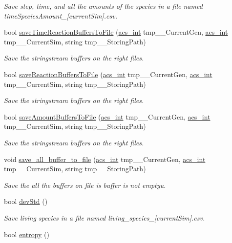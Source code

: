 \begin{DoxyCompactItemize}
\begin{DoxyCompactList}\small\item\em Save step, time, and all the amounts of the species in a file named time\-Species\-Amount\-\_\-\mbox{[}current\-Sim\mbox{]}.csv. \end{DoxyCompactList}\item 
bool \hyperlink{a00011_af36d51ba1965d3f23c879c0d0fb69026}{save\-Time\-Reaction\-Buffers\-To\-File} (\hyperlink{a00024_a8d277355641a098190360234e2ebde35}{acs\-\_\-int} tmp\-\_\-\-\_\-\-Current\-Gen, \hyperlink{a00024_a8d277355641a098190360234e2ebde35}{acs\-\_\-int} tmp\-\_\-\-\_\-\-Current\-Sim, string tmp\-\_\-\-\_\-\-Storing\-Path)
\begin{DoxyCompactList}\small\item\em Save the stringstream buffers on the right files. \end{DoxyCompactList}\item 
bool \hyperlink{a00011_ad88fbfd83b7713baf3b528d9a3675540}{save\-Reaction\-Buffers\-To\-File} (\hyperlink{a00024_a8d277355641a098190360234e2ebde35}{acs\-\_\-int} tmp\-\_\-\-\_\-\-Current\-Gen, \hyperlink{a00024_a8d277355641a098190360234e2ebde35}{acs\-\_\-int} tmp\-\_\-\-\_\-\-Current\-Sim, string tmp\-\_\-\-\_\-\-Storing\-Path)
\begin{DoxyCompactList}\small\item\em Save the stringstream buffers on the right files. \end{DoxyCompactList}\item 
bool \hyperlink{a00011_a3a7c8819ab4e81a3e2f18d193ba9176f}{save\-Amount\-Buffers\-To\-File} (\hyperlink{a00024_a8d277355641a098190360234e2ebde35}{acs\-\_\-int} tmp\-\_\-\-\_\-\-Current\-Gen, \hyperlink{a00024_a8d277355641a098190360234e2ebde35}{acs\-\_\-int} tmp\-\_\-\-\_\-\-Current\-Sim, string tmp\-\_\-\-\_\-\-Storing\-Path)
\begin{DoxyCompactList}\small\item\em Save the stringstream buffers on the right files. \end{DoxyCompactList}\item 
void \hyperlink{a00011_ac8b2bc669994dd3850769f4835dd40a2}{save\-\_\-all\-\_\-buffer\-\_\-to\-\_\-file} (\hyperlink{a00024_a8d277355641a098190360234e2ebde35}{acs\-\_\-int} tmp\-\_\-\-\_\-\-Current\-Gen, \hyperlink{a00024_a8d277355641a098190360234e2ebde35}{acs\-\_\-int} tmp\-\_\-\-\_\-\-Current\-Sim, string tmp\-\_\-\-\_\-\-Storing\-Path)
\begin{DoxyCompactList}\small\item\em Save the all the buffers on file is buffer is not emptyu. \end{DoxyCompactList}\item 
bool \hyperlink{a00011_ae7fd21d14f81c4854b3a6163b0278857}{dev\-Std} ()
\begin{DoxyCompactList}\small\item\em Save living species in a file named living\-\_\-species\-\_\-\mbox{[}current\-Sim\mbox{]}.csv. \end{DoxyCompactList}\item 
bool \hyperlink{a00011_a4e9b60ec8b05e888cf0e55def03ee906}{entropy} ()
\end{DoxyCompactItemize}



